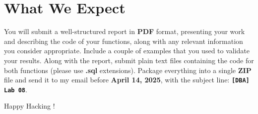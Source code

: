 \documentclass{article}
\begin{document}
\section{What We Expect}
You will submit a well-structured report in \textbf{PDF} format, presenting your work and describing the code of your functions, along with any relevant information you consider appropriate. Include a couple of examples that you used to validate your results. Along with the report, submit plain text files containing the code for both functions (please use \textbf{.sql} extensions). Package everything into a single \textbf{ZIP} file and send it to my email before \textbf{April 14, 2025}, with the subject line: {\LARGE \textbf{\texttt{[DBA] Lab 08}}}.

\vspace{5mm}
Happy Hacking !
\end{document}
